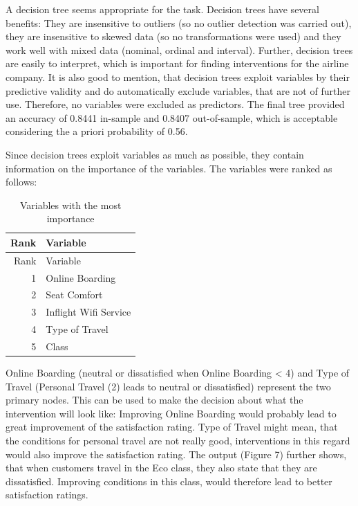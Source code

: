 \documentclass[
]{article}
\begin{document}
A decision tree seems appropriate for the task. Decision trees have
several benefits: They are insensitive to outliers (so no outlier
detection was carried out), they are insensitive to skewed data (so no
transformations were used) and they work well with mixed data (nominal,
ordinal and interval). Further, decision trees are easily to interpret,
which is important for finding interventions for the airline company. It
is also good to mention, that decision trees exploit variables by their
predictive validity and do automatically exclude variables, that are not
of further use. Therefore, no variables were excluded as predictors. The
final tree provided an accuracy of 0.8441 in-sample and 0.8407
out-of-sample, which is acceptable considering the a priori probability
of 0.56.

Since decision trees exploit variables as much as possible, they contain
information on the importance of the variables. The variables were
ranked as follows:

\begin{longtable}[]{@{}rl@{}}
\caption{Variables with the most importance}\tabularnewline
\toprule
Rank & Variable\tabularnewline
\midrule
\endfirsthead
\toprule
Rank & Variable\tabularnewline
\midrule
\endhead
1 & Online Boarding\tabularnewline
2 & Seat Comfort\tabularnewline
3 & Inflight Wifi Service\tabularnewline
4 & Type of Travel\tabularnewline
5 & Class\tabularnewline
\bottomrule
\end{longtable}

Online Boarding (neutral or dissatisfied when Online Boarding
\textless{} 4) and Type of Travel (Personal Travel (2) leads to neutral
or dissatisfied) represent the two primary nodes. This can be used to
make the decision about what the intervention will look like: Improving
Online Boarding would probably lead to great improvement of the
satisfaction rating. Type of Travel might mean, that the conditions for
personal travel are not really good, interventions in this regard would
also improve the satisfaction rating. The output (Figure 7) further
shows, that when customers travel in the Eco class, they also state that
they are dissatisfied. Improving conditions in this class, would
therefore lead to better satisfaction ratings.
\end{document}
